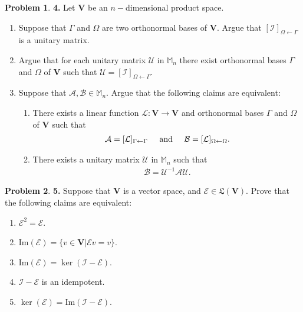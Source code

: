 \documentclass{article}
\theoremstyle{definition}
\newtheorem*{prob*}{Problem}
\newcommand{\Uni}{\mathcal{U}}
\newcommand{\V}{\mathbf{V}}
\newcommand{\A}{\mathcal{A}}
\newcommand{\B}{\mathcal{B}}
\newcommand{\lag}{\mathcal{L}}
\newcommand{\E}{\mathcal{E}}
\newcommand{\ima}{\text{Im}}
\newcommand{\LL}{\mathfrak{L}}
\newcommand{\id}{\mathcal{I}}
\begin{document}
\newpage



\begin{prob*}\textbf{4.} Let $\V$ be an $n-$dimensional product space.
	\begin{enumerate}
		\item Suppose that $\Gamma$ and $\Omega$ are two orthonormal bases of $\V$. Argue that $[\mathcal{I}]_{\Omega\leftarrow\Gamma}$ is a unitary matrix.
		
		\item Argue that for each unitary matrix $\Uni$ in $\mathbb{M}_n$ there exist orthonormal bases $\Gamma$ and $\Omega$ of $\V$ such that $\Uni = [\id]_{\Omega\leftarrow\Gamma}$. 
		
		
		\item Suppose that $\A, \B \in \mathbb{M}_n$. Argue that the following claims are equivalent:
		\begin{enumerate}
			\item There exists a linear function $\lag : \V \to \V$ and orthonormal bases $\Gamma$ and $\Omega$ of $\V$ such that 
			\begin{align*}
			\A = [\lag]_{\Gamma\leftarrow \Gamma} \hspace{0.5cm} \text{and} \hspace{0.5cm} \B = [\lag]_{\Omega \leftarrow\Omega}.
			\end{align*}
			
			\item There exists a unitary matrix $\Uni$ in $\mathbb{M}_n$ such that 
			\begin{align*}
			\B = \Uni^{-1}\A \Uni.
			\end{align*}
			
		\end{enumerate}
	\end{enumerate}
	
\end{prob*}







\newpage



\begin{prob*}\textbf{5.} Suppose that $\V$ is a vector space, and $\E \in \LL(\V)$. Prove that the following claims are equivalent:
	\begin{enumerate}
		\item $\E^2 = \E$.
		\item $\ima(\E)= \{ v \in \V \vert \E v = v \}$.
		\item $\ima(\E) = \ker(\id - \E)$.
		\item $\id - \E$ is an idempotent.
		\item $\ker(\E) = \ima(\id - \E)$.
	\end{enumerate}
\end{prob*}
\end{document}
